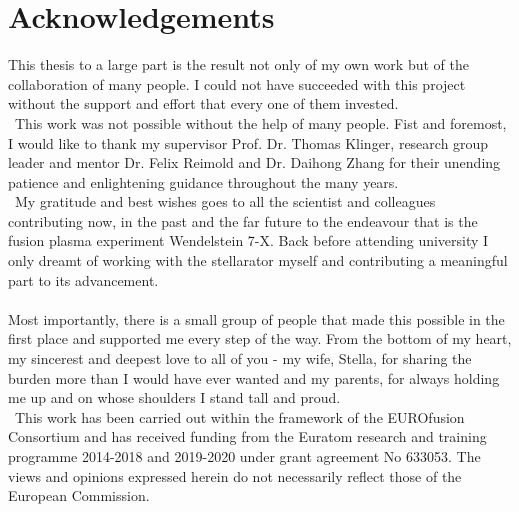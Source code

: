 %
\chapter*{Acknowledgements}\label{sec:acknowledgement}%
%
    This thesis to a large part is the result not only of my own work but of the collaboration of many people. I could not have succeeded with this project without the support and effort that every one of them invested.\\%
%
    \,\newline%
    This work was not possible without the help of many people. Fist and foremost, I would like to thank my supervisor Prof. Dr. Thomas Klinger, research group leader and mentor Dr. Felix Reimold and Dr. Daihong Zhang for their unending patience and enlightening guidance throughout the many years.\\%
%
    \,\newline%
    My gratitude and best wishes goes to all the scientist and colleagues contributing now, in the past and the far future to the endeavour that is the fusion plasma experiment Wendelstein 7-X. Back before attending university I only dreamt of working with the stellarator myself and contributing a meaningful part to its advancement.\\%
%
    \,\\%
    Most importantly, there is a small group of people that made this possible in the first place and supported me every step of the way. From the bottom of my heart, my sincerest and deepest love to all of you -  my wife, Stella, for sharing the burden more than I would have ever wanted and my parents, for always holding me up and on whose shoulders I stand tall and proud.\\%
%
    \,\newline%
    This work has been carried out within the framework of the EUROfusion Consortium and has received funding from the Euratom research and training programme 2014-2018 and 2019-2020 under grant agreement No 633053. The views and opinions expressed herein do not necessarily reflect those of the European Commission.
%
